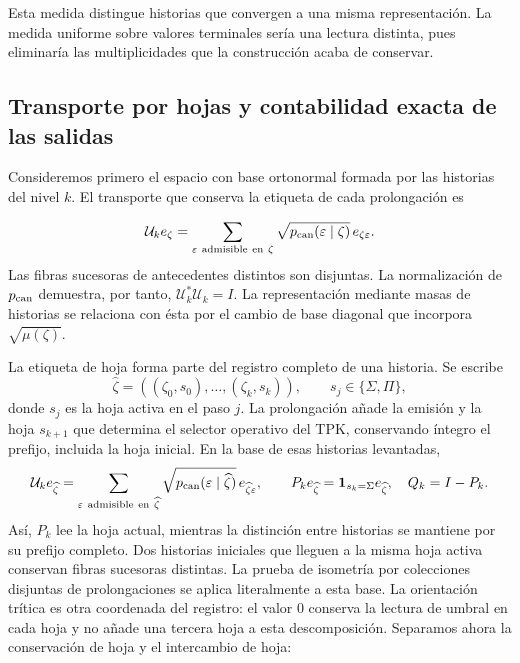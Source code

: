 Esta medida distingue historias que convergen a una misma representación. La medida uniforme sobre valores terminales sería una lectura distinta, pues eliminaría las multiplicidades que la construcción acaba de conservar.



\subsection{Transporte por hojas y contabilidad exacta de las salidas}
Consideremos primero el espacio con base ortonormal formada por las historias del nivel \(k\). El transporte que conserva la etiqueta de cada prolongación es

\[
\mathcal U_ke_\zeta=
\sum_{\varepsilon\ \mathrm{admisible\ en}\ \zeta}
\sqrt{p_{\rm can}(\varepsilon\mid\zeta)}\,e_{\zeta\varepsilon}.
\]
Las fibras sucesoras de antecedentes distintos son disjuntas. La normalización de \(p_{\rm can}\) demuestra, por tanto, \(\mathcal U_k^*\mathcal U_k=I\). La representación mediante masas de historias se relaciona con ésta por el cambio de base diagonal que incorpora \(\sqrt{\mu(\zeta)}\).

La etiqueta de hoja forma parte del registro completo de una historia. Se escribe
\[
\widehat\zeta=((\zeta_0,s_0),\ldots,(\zeta_k,s_k)),\qquad
s_j\in\{\Sigma,\Pi\},
\]
donde \(s_j\) es la hoja activa en el paso \(j\). La prolongación añade la emisión y la hoja \(s_{k+1}\) que determina el selector operativo del TPK, conservando íntegro el prefijo, incluida la hoja inicial. En la base de esas historias levantadas,
\[
\mathcal U_ke_{\widehat\zeta}
=\sum_{\varepsilon\ \mathrm{admisible\ en}\ \widehat\zeta}
\sqrt{p_{\rm can}(\varepsilon\mid\widehat\zeta)}\,e_{\widehat\zeta\varepsilon},
\qquad
P_ke_{\widehat\zeta}=\mathbf1_{s_k=\Sigma}e_{\widehat\zeta},\quad
Q_k=I-P_k.
\]
Así, \(P_k\) lee la hoja actual, mientras la distinción entre historias se mantiene por su prefijo completo. Dos historias iniciales que lleguen a la misma hoja activa conservan fibras sucesoras distintas. La prueba de isometría por colecciones disjuntas de prolongaciones se aplica literalmente a esta base.
La orientación trítica es otra coordenada del registro: el valor \(0\) conserva la lectura de umbral en cada hoja y no añade una tercera hoja a esta descomposición. Separamos ahora la conservación de hoja y el intercambio de hoja:

